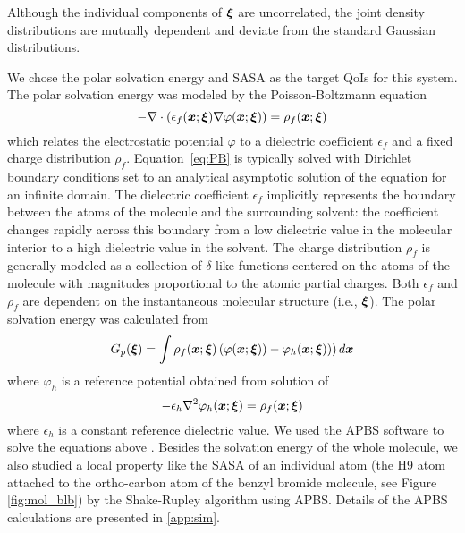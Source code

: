 Although the individual components of $\bm\xi$ are uncorrelated, the joint density distributions are mutually dependent and deviate from the standard Gaussian distributions. 

We chose the polar solvation energy and \ac{SASA} as the target \acp{QoI} for this system.
The polar solvation energy was modeled by the Poisson-Boltzmann equation \cite{ren_biomolecular_2012,baker_biomolecular_2005}
\begin{equation}
  -\nabla \cdot (\epsilon_f(\bm x; \bm\xi) \nabla \varphi(\bm x; \bm\xi)) = \rho_f(\bm x; \bm\xi)
  \label{eq:PB}
\end{equation}
which relates the electrostatic potential $\varphi$ to a dielectric coefficient $\epsilon_f$ and a fixed charge distribution $\rho_f$. 
Equation~\eqref{eq:PB} is typically solved with Dirichlet boundary conditions set to an analytical asymptotic solution of the equation for an infinite domain. 
The dielectric coefficient $\epsilon_f$ implicitly represents the boundary between the atoms of the molecule and the surrounding solvent:  the coefficient changes rapidly across this boundary from a low dielectric value in the molecular interior to a high dielectric value in the solvent.
The charge distribution $\rho_f$ is generally modeled as a collection of $\delta$-like functions centered on the atoms of the molecule with magnitudes proportional to the atomic partial charges.
Both $\epsilon_f$ and $\rho_f$ are dependent on the instantaneous molecular structure (i.e., $\bm\xi$).
The polar solvation energy was calculated from 
\begin{equation}
  G_p(\bm\xi) = \int \rho_f(\bm x; \bm\xi) \left( \varphi(\bm x; \bm\xi)) - \varphi_h(\bm x; \bm\xi)) \right) d \bm x
\end{equation}
where $\varphi_h$ is a reference potential obtained from solution of
\begin{equation}
  -\epsilon_h \nabla^2 \varphi_h(\bm x; \bm\xi) = \rho_f(\bm x; \bm\xi)
\end{equation}
where $\epsilon_h$ is a constant reference dielectric value.
We used the \ac{APBS} software to solve the equations above \cite{APBS_2018}.
Besides the solvation energy of the whole molecule, we also studied a local property like the \ac{SASA} of an individual atom 
(the H9 atom attached to the ortho-carbon atom of the benzyl bromide molecule, see Figure \ref{fig:mol_blb}) 
by the Shake-Rupley algorithm \cite{Shrake_JMB_1973} using \ac{APBS}.
Details of the \ac{APBS} calculations are presented in \ref{app:sim}.

